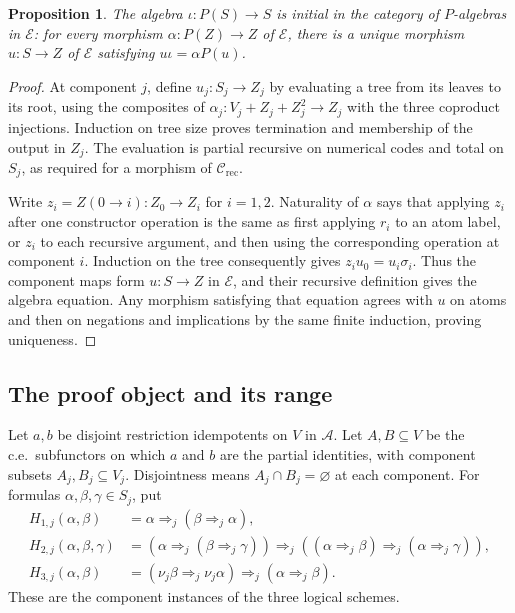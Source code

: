 \documentclass[11pt]{article}
\newtheorem{proposition}[theorem]{Proposition}
\begin{document}
\begin{proposition}\label{prop:fork-syntax-initial}
The algebra $\iota:P(S)\to S$ is initial in the category of
$P$-algebras in $\mathcal E$: for every morphism
$\alpha:P(Z)\to Z$ of $\mathcal E$, there is a unique morphism
$u:S\to Z$ of $\mathcal E$ satisfying $u\iota=\alpha P(u)$.
\end{proposition}
\begin{proof}
At component $j$, define $u_j:S_j\to Z_j$ by evaluating a tree
from its leaves to its root, using the composites of
$\alpha_j:V_j+Z_j+Z_j^2\to Z_j$ with the three coproduct injections.
Induction on tree size proves termination and membership
of the output in $Z_j$. The evaluation is partial recursive on
numerical codes and total on $S_j$, as required for a morphism of
$\mathcal C_{\mathrm{rec}}$.

Write $z_i=Z(0\to i):Z_0\to Z_i$ for $i=1,2$. Naturality of
$\alpha$ says that applying $z_i$ after one constructor operation
is the same as first applying $r_i$ to an atom label, or $z_i$
to each recursive argument, and then using the corresponding
operation at component $i$. Induction on the tree consequently
gives $z_i u_0=u_i\sigma_i$. Thus the component maps form
$u:S\to Z$ in $\mathcal E$, and their recursive definition gives
the algebra equation. Any morphism satisfying that equation agrees
with $u$ on atoms and then on negations and implications by the
same finite induction, proving uniqueness.
\end{proof}

\subsection{The proof object and its range}

Let $a,b$ be disjoint restriction idempotents on $V$ in $\mathcal A$.
Let $A,B\subseteq V$ be the c.e.\ subfunctors on which
$a$ and $b$ are the partial identities, with component subsets
$A_j,B_j\subseteq V_j$. Disjointness
means $A_j\cap B_j=\varnothing$ at each component.
For formulas $\alpha,\beta,\gamma\in S_j$, put
\begin{align*}
 H_{1,j}(\alpha,\beta)
   &=\alpha\Rightarrow_j(\beta\Rightarrow_j\alpha),\\
 H_{2,j}(\alpha,\beta,\gamma)
   &=(\alpha\Rightarrow_j(\beta\Rightarrow_j\gamma))
     \Rightarrow_j((\alpha\Rightarrow_j\beta)
                          \Rightarrow_j(\alpha\Rightarrow_j\gamma)),\\
 H_{3,j}(\alpha,\beta)
   &=(\nu_j\beta\Rightarrow_j\nu_j\alpha)
                          \Rightarrow_j(\alpha\Rightarrow_j\beta).
\end{align*}
These are the component instances of the three logical schemes.
\end{document}
